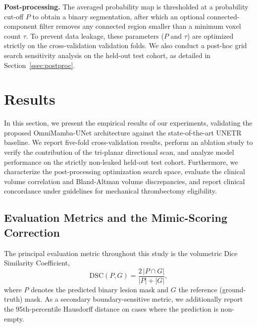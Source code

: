 \documentclass[pdflatex,sn-mathphys-num]{sn-jnl}
\begin{document}
\textbf{Post-processing.} The averaged probability map is thresholded
at a probability cut-off $P$ to obtain a binary segmentation, after
which an optional connected-component filter removes any connected
region smaller than a minimum voxel count $\tau$. To prevent data leakage, these parameters ($P$ and $\tau$) are optimized strictly on the cross-validation validation folds. We also conduct a post-hoc grid search sensitivity analysis on the held-out test cohort, as detailed in Section~\ref{ssec:postproc}.

\section{Results}\label{sec:results}

In this section, we present the empirical results of our experiments, validating the proposed OmniMamba-UNet architecture against the state-of-the-art UNETR baseline. We report five-fold cross-validation results, perform an ablation study to verify the contribution of the tri-planar directional scan, and analyze model performance on the strictly non-leaked held-out test cohort. Furthermore, we characterize the post-processing optimization search space, evaluate the clinical volume correlation and Bland-Altman volume discrepancies, and report clinical concordance under guidelines for mechanical thrombectomy eligibility.

\subsection{Evaluation Metrics and the Mimic-Scoring Correction}\label{ssec:eval}
The principal evaluation metric throughout this study is the
volumetric Dice Similarity Coefficient,
\begin{equation}
\text{DSC}(P,G) = \frac{2\,|P \cap G|}{|P| + |G|},
\label{eq:dice}
\end{equation}
where $P$ denotes the predicted binary lesion mask and $G$ the
reference (ground-truth) mask. As a secondary boundary-sensitive
metric, we additionally report the 95th-percentile Hausdorff distance
on cases where the prediction is non-empty.
\end{document}
